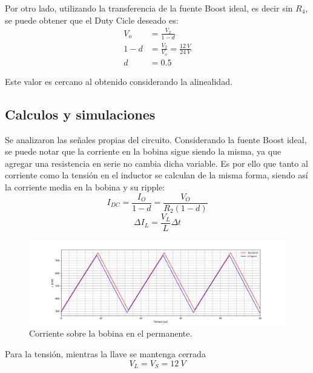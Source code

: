 Por otro lado, utilizando la transferencia de la fuente Boost ideal, es decir sin $R_4$, se puede obtener que el Duty Cicle deseado es:
\begin{align*}
V_o &= \frac{V_2}{1 - d}	\\
1 - d &= \frac{V_2}{V_o} = \frac{12 \ V}{24 \ V} \\
d &= 0.5
\end{align*}

Este valor es cercano al obtenido considerando la alinealidad.



\subsection{Calculos y simulaciones}

Se analizaron las señales propias del circuito. Considerando la fuente Boost ideal, se puede notar que la corriente en la bobina sigue siendo la misma, ya que agregar una resistencia en serie no cambia dicha variable. Es por ello que tanto al corriente como la tensión en el inductor se calculan de la misma forma, siendo así la corriente media en la bobina y su ripple:
\begin{equation*}
	I_{DC} = \frac{I_O}{1 - d} = \frac{V_O}{R_2 (1 - d)}
\end{equation*}		%
\begin{equation*}
	\Delta I_L = \frac{V_L}{L}\Delta t
\end{equation*}

\begin{figure}[H]
	\centering
	\includegraphics[width=\linewidth]{ImagenesEjercicio-2/il.png}
	\caption{Corriente sobre la bobina en el permanente.}
	\label{fig:ej2:il}
\end{figure}

Para la tensión, mientras la llave se mantenga cerrada
\begin{equation*}
	V_L = V_S = 12 \ V
\end{equation*}

